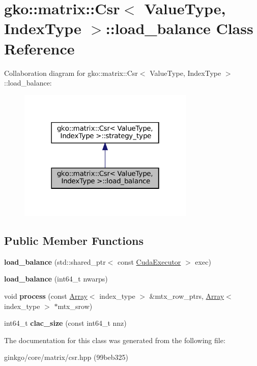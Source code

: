\hypertarget{classgko_1_1matrix_1_1Csr_1_1load__balance}{}\section{gko\+:\+:matrix\+:\+:Csr$<$ Value\+Type, Index\+Type $>$\+:\+:load\+\_\+balance Class Reference}
\label{classgko_1_1matrix_1_1Csr_1_1load__balance}


Collaboration diagram for gko\+:\+:matrix\+:\+:Csr$<$ Value\+Type, Index\+Type $>$\+:\+:load\+\_\+balance\+:
\nopagebreak
\begin{figure}[H]
\begin{center}
\leavevmode
\includegraphics[width=238pt]{classgko_1_1matrix_1_1Csr_1_1load__balance__coll__graph}
\end{center}
\end{figure}
\subsection*{Public Member Functions}
\begin{DoxyCompactItemize}
\item 
\mbox{\label{classgko_1_1matrix_1_1Csr_1_1load__balance_ad80a0ef5dd9bb2e4f311e59e5e4e013e}} 
{\bfseries load\+\_\+balance} (std\+::shared\+\_\+ptr$<$ const \hyperlink{classgko_1_1CudaExecutor}{Cuda\+Executor} $>$ exec)
\item 
\mbox{\label{classgko_1_1matrix_1_1Csr_1_1load__balance_a851a72f0ac2f8be45982b5aa0b85d15d}} 
{\bfseries load\+\_\+balance} (int64\+\_\+t nwarps)
\item 
\mbox{\label{classgko_1_1matrix_1_1Csr_1_1load__balance_a8219420a14f2d6fc2242897900ce4448}} 
void {\bfseries process} (const \hyperlink{classgko_1_1Array}{Array}$<$ index\+\_\+type $>$ \&mtx\+\_\+row\+\_\+ptrs, \hyperlink{classgko_1_1Array}{Array}$<$ index\+\_\+type $>$ $\ast$mtx\+\_\+srow)
\item 
\mbox{\label{classgko_1_1matrix_1_1Csr_1_1load__balance_aafc499605813d57af41c57744d44e133}} 
int64\+\_\+t {\bfseries clac\+\_\+size} (const int64\+\_\+t nnz)
\end{DoxyCompactItemize}


The documentation for this class was generated from the following file\+:\begin{DoxyCompactItemize}
\item 
ginkgo/core/matrix/csr.\+hpp (99beb325)\end{DoxyCompactItemize}
